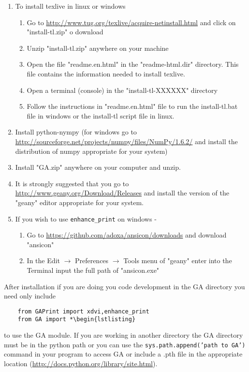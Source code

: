 \documentclass[10pt]{article}
\newcommand{\T}[1]{\texttt{#1}}
\begin{document}
\begin{enumerate}
    \item To install texlive in linux or windows
        \begin{enumerate}
        \item Go to \url{http://www.tug.org/texlive/acquire-netinstall.html} and click on "install-tl.zip" o download
        \item Unzip "install-tl.zip" anywhere on your machine
        \item Open the file "readme.en.html" in the "readme-html.dir" directory.  This file contains the information needed to install texlive.
        \item Open a terminal (console) in the "install-tl-XXXXXX" directory
        \item Follow the instructions in "readme.en.html" file to run the install-tl.bat file in windows or the install-tl script file in linux.
        \end{enumerate}
    \item Install python-nympy (for windows go to \url{http://sourceforge.net/projects/numpy/files/NumPy/1.6.2/} and install the distribution of 
          numpy appropriate for your system)
    \item Install "GA.zip" anywhere on your computer and unzip.
    \item It is strongly suggested that you go to \url{http://www.geany.org/Download/Releases} and install the version of the "geany" 
          editor appropriate for your system.
    \item If you wish to use \T{enhance\_print} on windows -
        \begin{enumerate}
        \item Go to \url{https://github.com/adoxa/ansicon/downloads} and download "ansicon"
        \item In the Edit $\rightarrow$ Preferences $\rightarrow$ Tools menu of "geany" enter into the Terminal input the full path of "ansicon.exe"
	    \end{enumerate}
	\end{enumerate}

After installation if you are doing you code development in the GA directory you need only include

\begin{lstlisting}
    from GAPrint import xdvi,enhance_print
    from GA import *\begin{lstlisting}
\end{lstlisting}

to use the GA module.  If you are working in another directory the GA directory must be in the python path or
you can use the \T{sys.path.append('path to GA')} command in your program to access GA or include a .pth file
in the appropriate location (\url{http://docs.python.org/library/site.html}).
\end{document}
